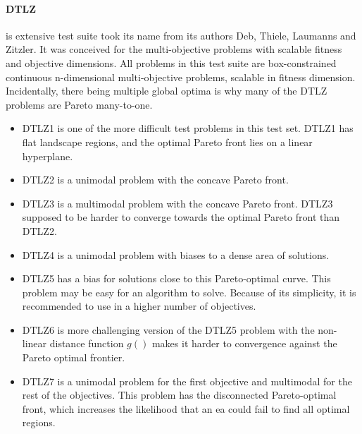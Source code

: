         \paragraph{DTLZ} is extensive test suite took its name from its authors Deb, Thiele, Laumanns and Zitzler. It was conceived for the multi-objective problems with scalable fitness and objective dimensions.  All problems in this test suite are box-constrained continuous n-dimensional multi-objective problems, scalable in fitness dimension. Incidentally, there being multiple global optima is why many of the DTLZ problems are Pareto many-to-one. 
        \begin{itemize}
            \item DTLZ1  is one of the more difficult test problems in this test set. DTLZ1 has flat landscape regions, and the optimal Pareto front lies on a linear hyperplane. 
            \item DTLZ2 is a unimodal problem with the concave Pareto front.
            \item DTLZ3 is a multimodal problem with the concave Pareto front. DTLZ3 supposed to be harder to converge towards the optimal Pareto front than DTLZ2.
            \item DTLZ4 is a unimodal problem with biases to a dense area of solutions.
            \item DTLZ5 has a bias for solutions close to this Pareto-optimal curve. This problem may be easy for an algorithm to solve. Because of its simplicity, it is recommended to use in a higher number of objectives.
            \item DTLZ6 is more challenging version of the DTLZ5 problem with the non-linear distance function $g()$ makes it harder to convergence against the Pareto optimal frontier.
            \item DTLZ7 is a unimodal problem for the first objective and multimodal for the rest of the objectives. This problem has the disconnected Pareto-optimal front, which increases the likelihood that an \gls{ea} could fail to find all optimal regions.
        \end{itemize}

